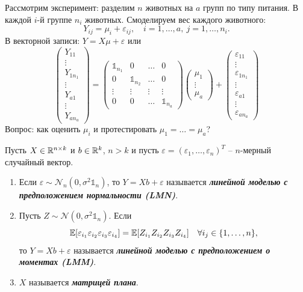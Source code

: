 \begin{exmp}
	Рассмотрим эксперимент: разделим $n$ животных на $a$ групп по типу питания. В каждой $i$-й группе $n_i$ животных. Смоделируем вес каждого животного:
	\[ Y_{ij} = \mu_i + \varepsilon_{ij}, \quad i = 1, \dots, a,\ j = 1, \dots, n_i. \]
	В векторной записи: $Y = X\mu + \varepsilon$ или
	\[ \begin{pmatrix}
	Y_{11} \\
	\vdots \\
	Y_{1n_1} \\
	\vdots \\
	Y_{a1} \\
	\vdots \\
	Y_{an_a}
	\end{pmatrix}  =
	\begin{pmatrix}
	\mathds{1}_{n_1} & 0 & \dots & 0\\
	0 & \mathds{1}_{n_2} & \dots & 0 \\
	\vdots & \vdots & \vdots & \vdots \\
	0 & 0 & \dots & \mathds{1}_{n_a}
	\end{pmatrix}
	\begin{pmatrix}
	\mu_{1} \\
	\vdots \\
	\mu_{a}
	\end{pmatrix} +
	\begin{pmatrix}
	\varepsilon_{11} \\
	\vdots \\
	\varepsilon_{1n_1} \\
	\vdots \\
	\varepsilon_{a1} \\
	\vdots \\
	\varepsilon_{an_a}
	\end{pmatrix}
	\]
	Вопрос: как оценить $\mu_i$ и протестировать $\mu_1 = \dots = \mu_a$?
\end{exmp}

\begin{defn}
	Пусть $X \in \mathbb{R}^{n \times k}$ и $b \in \mathbb{R}^k$, $n > k$ и пусть $\varepsilon = (\varepsilon_1, \dots, \varepsilon_n)^T$ -- $n$-мерный случайный вектор.
	\begin{enumerate}
		\item Если $\varepsilon \sim \mathcal{N}_n(0, \sigma^2 \mathds{1}_n)$, то $Y = Xb + \varepsilon$ называется \textbf{\textit{линейной моделью с предположением нормальности (LMN)}}.
		\item Пусть $Z \sim \mathcal{N}(0, \sigma^2 \mathds{1}_n)$. Если
		\[ \mathbb{E}[\varepsilon_{i_1}\varepsilon_{i_2}\varepsilon_{i_3}\varepsilon_{i_4}]  = \mathbb{E}[Z_{i_1}Z_{i_2}Z_{i_3}Z_{i_4}] \quad \forall i_j \in \{ 1, \dots, n \}, \]
		то $Y = Xb + \varepsilon$ называется \textbf{\textit{линейной моделью с предположением о моментах (LMM)}}.
		\item $X$ называется \textbf{\textit{матрицей плана}}.
	\end{enumerate}
\end{defn}

